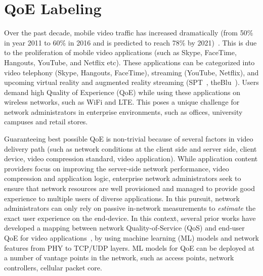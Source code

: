 \section{QoE Labeling}

Over the past decade, mobile video traffic has increased dramatically (from 50\% in year 2011 to 60\% in 2016 and is predicted to reach 78\% by 2021)~\cite{forecast2016cisco}. This is due to the proliferation of mobile video applications (such as Skype, FaceTime, Hangouts, YouTube, and Netflix etc). These applications can be categorized into video telephony (Skype, Hangouts, FaceTime), streaming (YouTube, Netflix), and upcoming virtual reality and augmented reality streaming (SPT~\cite{spt}, theBlu~\cite{theblu}). 
Users demand high Quality of Experience (QoE) while using these applications on wireless networks, such as WiFi and LTE. This poses a unique challenge for network administrators in enterprise environments, such as offices, university campuses and retail stores.

Guaranteeing best possible QoE is non-trivial because of several factors in video delivery path (such as network conditions at the client side and server side, client device, video compression standard, video application). While application content providers focus on improving the server-side network performance, video compression and application logic, enterprise network administrators seek to ensure that network resources are well provisioned and managed to provide good experience to multiple users of diverse applications. In this pursuit, network administrators can only rely on passive in-network measurements to {\em estimate} the exact user experience on the end-device. In this context, several prior works have developed a mapping between network Quality-of-Service (QoS) and end-user QoE for video applications~\cite{balachandran2013developing,aggarwal2014prometheus,fiedler2010generic}, by using machine learning (ML) models and network features from PHY to TCP/UDP layers. ML models for QoE can be deployed at a number of vantage points in the network, such as access points, network controllers, cellular packet core. 

